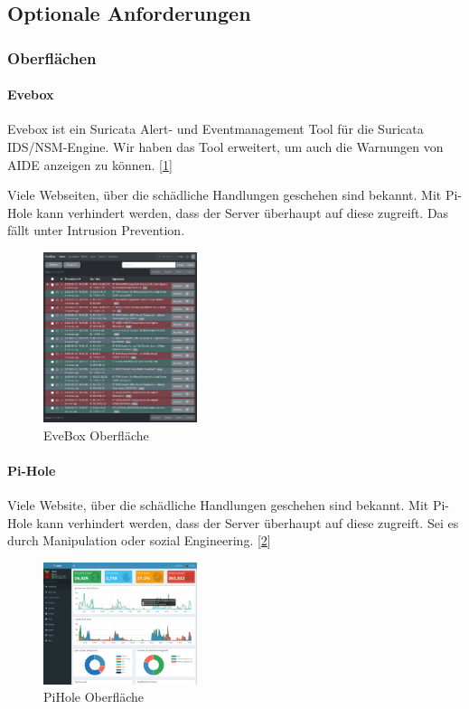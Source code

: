 \documentclass{article}
\begin{document}
\vfil \break

\subsection{Optionale Anforderungen}
\subsubsection{Oberflächen}
\paragraph{Evebox}
Evebox ist ein Suricata Alert- und Eventmanagement Tool für die Suricata IDS/NSM-Engine. Wir haben das Tool erweitert, um auch die Warnungen von AIDE anzeigen zu können. [\ref{fig:EveBox}]

Viele Webseiten, über die schädliche Handlungen geschehen sind bekannt. Mit Pi-Hole kann verhindert werden, dass der Server überhaupt auf diese zugreift. Das fällt unter Intrusion Prevention.

\begin{figure}[ht]
    \centering
    \includegraphics[width=0.4\textwidth]{assets/EveBox.png}
    \caption[\href{https://evebox.org/}{EveBox von Evebox}]{\label{fig:EveBox}EveBox Oberfläche}
\end{figure}

\paragraph{Pi-Hole}
Viele Website, über die schädliche Handlungen geschehen sind bekannt. Mit Pi-Hole kann verhindert werden, dass der Server überhaupt auf diese zugreift. Sei es durch Manipulation oder sozial Engineering. [\ref{fig:PiHole}]

\begin{figure}[ht]
    \centering
    \includegraphics[width=0.4\textwidth]{assets/PiHole.png}
    \caption[\href{https://commons.wikimedia.org/w/index.php?curid=71217077}{PiHole von Wikimedia}]{\label{fig:PiHole}PiHole Oberfläche}
\end{figure}
\end{document}
